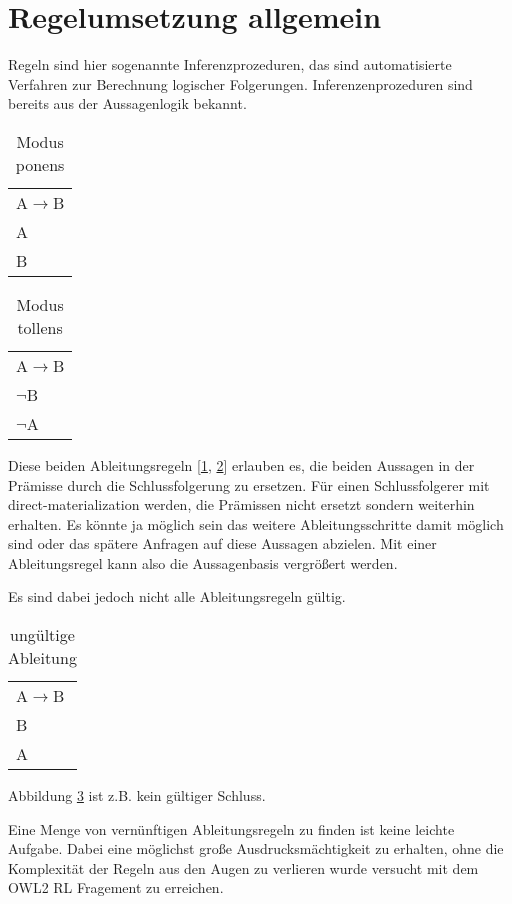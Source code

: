\section{Regelumsetzung allgemein}
\label{abschnitt-regelumsetzung}
Regeln sind hier sogenannte Inferenzprozeduren, das sind automatisierte Verfahren zur Berechnung logischer Folgerungen. Inferenzenprozeduren sind bereits aus der Aussagenlogik bekannt.

\begin{table}[htb]
\begin{center}
	\begin{tabular}{l}
	A$\rightarrow$B \\
	A \\
	\hline
	B
	\end{tabular}
\end{center}
	\caption{Modus ponens}
	\label{table-modus-ponens}
\end{table}

\begin{table}[htb]
\begin{center}
	\begin{tabular}{l}
	A$\rightarrow$B \\
	$\neg$B \\
	\hline
	$\neg$A
	\end{tabular}
\end{center}
	\caption{Modus tollens}
	\label{table-modus-tollens}
\end{table}

Diese beiden Ableitungsregeln [\ref{table-modus-ponens}, \ref{table-modus-tollens}] erlauben es, die beiden Aussagen in der Prämisse durch die Schlussfolgerung zu ersetzen. Für einen Schlussfolgerer mit direct-materialization werden, die Prämissen nicht ersetzt sondern weiterhin erhalten. Es könnte ja möglich sein das weitere Ableitungsschritte damit möglich sind oder das spätere Anfragen auf diese Aussagen abzielen. Mit einer Ableitungsregel kann also die Aussagenbasis vergrößert werden.

Es sind dabei jedoch nicht alle Ableitungsregeln gültig.
\begin{table}[htb]
\begin{center}
	\begin{tabular}{l}
	A$\rightarrow$B \\
	B \\
	\hline
	A
	\end{tabular}
\end{center}
	\caption{ungültige Ableitung}
	\label{table-invalid-inferred}
\end{table}
Abbildung \ref{table-invalid-inferred} ist z.B. kein gültiger Schluss.

Eine Menge von vernünftigen Ableitungsregeln zu finden ist keine leichte Aufgabe. Dabei eine möglichst große Ausdrucksmächtigkeit zu erhalten, ohne die Komplexität der Regeln aus den Augen zu verlieren wurde versucht mit dem OWL2 RL Fragement zu erreichen.




